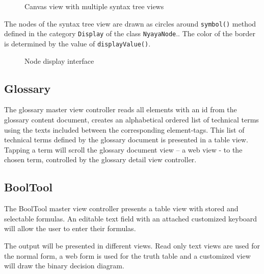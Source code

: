 \begin{figure}[htbp]
\begin{center}
\caption{Canvas view with multiple syntax tree views}
\label{fig:TreeView}
\end{center}
\end{figure}

The nodes of the syntax tree view are drawn as circles around \verb+symbol()+ 
method defined in the category
\verb+Display+ of the class \verb+NyayaNode+..
The color of the border is determined by the value of \verb+displayValue()+.


\begin{figure}[htbp]
\begin{center}
\caption{Node display interface}
\label{fig:NyayaNodeDisplay}
\end{center}
\end{figure}

\subsection{Glossary}

The glossary master view controller reads all elements with an id from the glossary content document,
creates an alphabetical ordered list of technical terms using the texts included between the corresponding element-tags.
This list of technical terms defined by the glossary document is presented in a table view.
Tapping a term will scroll the glossary document view – a web view - to the chosen term, 
controlled by the glossary detail view controller.

\subsection{BoolTool}

The BoolTool master view controller presents a table view with stored and selectable formulas.
An editable text field with an attached customized keyboard will allow the user to enter their formulas.

The output will be presented in different views. Read only text views are used for the normal form, 
a web form is used for the truth table and a customized view will draw the binary decision diagram.



